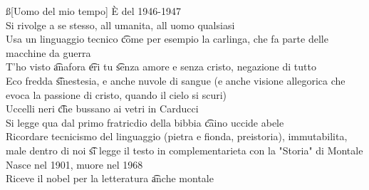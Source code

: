 \documentclass[12pt]{article}
\begin{document}
\ss[Uomo del mio tempo]
È del 1946-1947 \\
Si rivolge a se stesso, all umanita, all uomo qualsiasi \\
Usa un linguaggio tecnico \t come per esempio la carlinga, che fa parte delle macchine da guerra \\
T'ho visto \t anafora \t eri tu \t senza amore e senza cristo, negazione di tutto \\
Eco fredda \t sinestesia, e anche nuvole di sangue (e anche visione allegorica che evoca la passione di cristo, quando il cielo si scuri) \\
Uccelli neri \t che bussano ai vetri in Carducci \\
Si legge qua dal primo fratricdio della bibbia \t caino uccide abele \\
Ricordare tecnicismo del linguaggio (pietra e fionda, preistoria), immutabilita, male dentro di noi \t si legge il testo in complementarieta con la "Storia" di Montale \\
Nasce nel 1901, muore nel 1968 \\
Riceve il nobel per la letteratura \t anche montale
\end{document}
